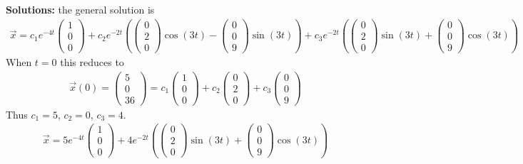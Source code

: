 \ifnum {} {\color{DarkBlue} 
\textbf{Solutions:} the general solution is
\begin{align*}
    \vec x = c_1 e^{-4t}\begin{pmatrix} 1\\0\\0\end{pmatrix} 
    + c_2e^{-2t}\left(\begin{pmatrix} 0\\2\\0\end{pmatrix} \cos(3t) - \begin{pmatrix} 0\\0\\9  \end{pmatrix} \sin(3t) \right) 
    + c_3e^{-2t}\left(\begin{pmatrix} 0\\2\\0\end{pmatrix} \sin(3t) + \begin{pmatrix} 0\\0\\9  \end{pmatrix} \cos(3t) \right) 
\end{align*}
When $t=0$ this reduces to
\begin{align*}
    \vec x(0) = \begin{pmatrix} 5\\0\\36\end{pmatrix} = c_1 \begin{pmatrix} 1\\0\\0\end{pmatrix} 
    + c_2 \begin{pmatrix} 0\\2\\0\end{pmatrix} 
    + c_3  \begin{pmatrix} 0\\0\\9  \end{pmatrix}  
\end{align*}
Thus $c_1= 5$, $c_2=0$, $c_3= 4$.
\begin{align*}
    \vec x = 5 e^{-4t}\begin{pmatrix} 1\\0\\0\end{pmatrix} 
        + 4e^{-2t}\left(\begin{pmatrix} 0\\2\\0\end{pmatrix} \sin(3t) + \begin{pmatrix} 0\\0\\9  \end{pmatrix} \cos(3t) \right) 
\end{align*}
} 
\else 
\newpage
\fi
\fi



